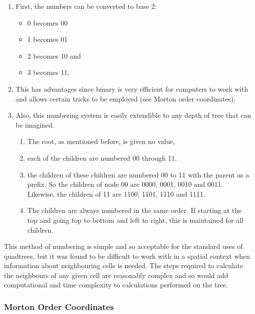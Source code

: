 \begin{enumerate}
	\item First, the numbers can be converted to base 2:
	\begin{itemize}
		\item 0 becomes 00
		\item 1 becomes 01
		\item 2 becomes 10 and
		\item 3 becomes 11.
	\end{itemize}

	\item This has advantages since binary is very efficient for computers to
	work with and allows certain tricks to be employed (see Morton order
	coordinates).

	\item Also, this numbering system is easily extendible to any depth of
	tree that can be imagined.

	\begin{enumerate}
		\item The root, as mentioned before, is given no value,
		\item each of the children are numbered {00} through 11.

		\item the children of these children are numbered 00 to 11 with the
		parent as a prefix. So the children of node 00 are 0000, 0001, 0010
		and 0011. Likewise, the children of 11 are 1100, 1101, 1110 and 1111.

		\item The children are always numbered in the same order. If starting
		at the top and going top to bottom and left to right, this is
		maintained for all children.
	\end{enumerate}
\end{enumerate}

This method of numbering is simple and so acceptable for the standard uses of
quadtrees, but it was found to be difficult to work with in a spatial context
when information about neighbouring cells is needed. The steps required to
calculate the neighbours of any given cell are reasonably complex and so would
add computational and time complexity to calculations performed on the tree.

\subsubsection*{Morton Order Coordinates}
\label{ssub:Morton Order Coordinates}

